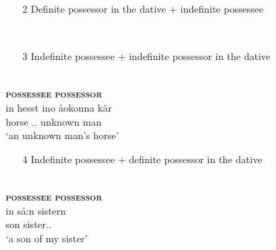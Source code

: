 \z 
\z 

\begin{enumerate}
\item[2] Definite possessor in the dative + indefinite possessee
\end{enumerate} 

\ea\label{}
\\

\z 
\z

\begin{enumerate} 
\item[3] Indefinite possessee + indefinite possessor in the dative
\end{enumerate} 

\ea 
{}\\
\glll \textbf{\textsc{possessee}} \textbf{\textsc{possessor}}\\
in  hesst  ino  åokonna  kär\\
{\indf}  horse  {\indf}.{\dat}.{\m}  unknown  man\\
\glt  ‘an unknown man’s horse’
\z

\begin{enumerate}
\item[4] Indefinite possessee + definite possessor in the dative
\end{enumerate} 


\ea\label{}
\\
\glll \textbf{\textsc{possessee}} \textbf{\textsc{possessor}}\\
in  så:n  sistern\\
{\indf}  son  sister.{}.{\dat}\\
\glt ‘a son of my sister’
\z


